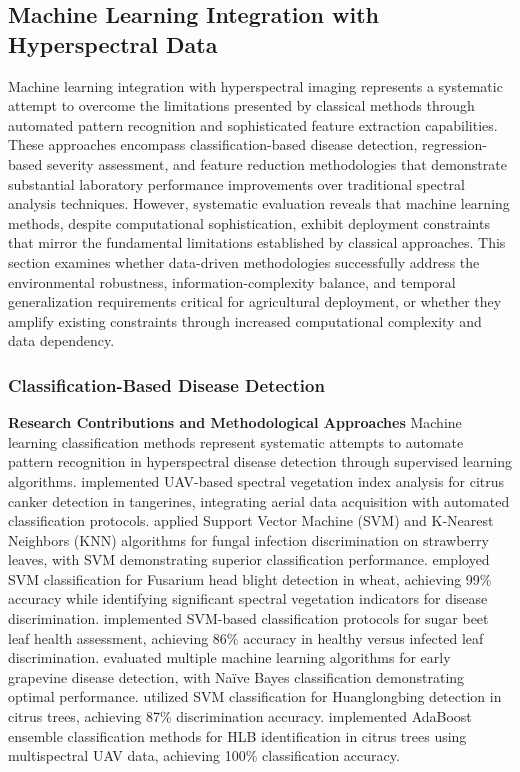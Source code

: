 \documentclass[sn-mathphys]{sn-jnl}
\theoremstyle{thmstyleone}%
\theoremstyle{thmstyletwo}%
\theoremstyle{thmstylethree}%
\begin{document}
\subsection{Machine Learning Integration with Hyperspectral Data}

Machine learning integration with hyperspectral imaging represents a systematic attempt to overcome the limitations presented by classical methods through automated pattern recognition and sophisticated feature extraction capabilities. These approaches encompass classification-based disease detection, regression-based severity assessment, and feature reduction methodologies that demonstrate substantial laboratory performance improvements over traditional spectral analysis techniques. However, systematic evaluation reveals that machine learning methods, despite computational sophistication, exhibit deployment constraints that mirror the fundamental limitations established by classical approaches. This section examines whether data-driven methodologies successfully address the environmental robustness, information-complexity balance, and temporal generalization requirements critical for agricultural deployment, or whether they amplify existing constraints through increased computational complexity and data dependency.

\subsubsection{Classification-Based Disease Detection}
\textbf{Research Contributions and Methodological Approaches}
Machine learning classification methods represent systematic attempts to automate pattern recognition in hyperspectral disease detection through supervised learning algorithms. \citet{abdulridha2019uav} implemented UAV-based spectral vegetation index analysis for citrus canker detection in tangerines, integrating aerial data acquisition with automated classification protocols. \citet{cheshkova2023application} applied Support Vector Machine (SVM) and K-Nearest Neighbors (KNN) algorithms for fungal infection discrimination on strawberry leaves, with SVM demonstrating superior classification performance. \citet{alisaac2018hyperspectral} employed SVM classification for Fusarium head blight detection in wheat, achieving 99\% accuracy while identifying significant spectral vegetation indicators for disease discrimination. \citet{rumpf2010early} implemented SVM-based classification protocols for sugar beet leaf health assessment, achieving 86\% accuracy in healthy versus infected leaf discrimination. \citet{calamita2021early} evaluated multiple machine learning algorithms for early grapevine disease detection, with Naïve Bayes classification demonstrating optimal performance. \citet{sankaran2013huanglongbing} utilized SVM classification for Huanglongbing detection in citrus trees, achieving 87\% discrimination accuracy. \citet{lan2020comparison} implemented AdaBoost ensemble classification methods for HLB identification in citrus trees using multispectral UAV data, achieving 100\% classification accuracy.
\end{document}
